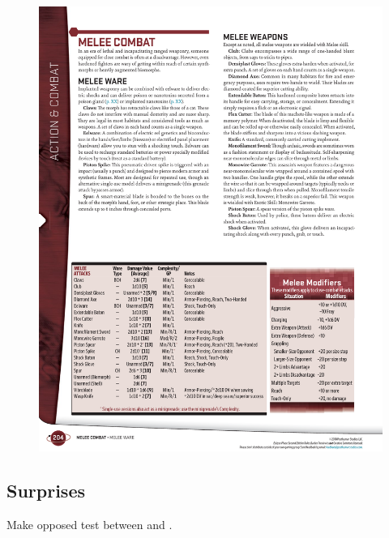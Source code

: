 
\begin{figure}[h!]%
   \includegraphics[scale=0.75]{gfx/combat-melee-modifiers}%
\end{figure}%



\subsection*{Surprises}

\begin{itemize}
    \itembox Make opposed test between  and .
\end{itemize}



